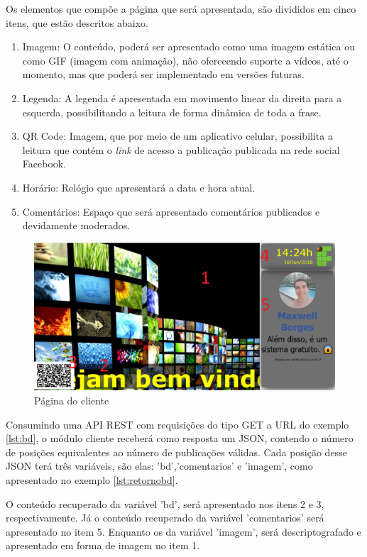 Os elementos que compõe a página que será apresentada, são divididos em cinco itens, que estão descritos abaixo.

\begin{enumerate}
   \item Imagem: O conteúdo, poderá ser apresentado como uma imagem estática ou como GIF (imagem com animação), não oferecendo suporte a vídeos, até o momento, mas que poderá ser implementado em versões futuras. 
   \item Legenda: A legenda é apresentada em movimento linear da direita para a esquerda, possibilitando a leitura de forma dinâmica de toda a frase.
   \item QR Code: Imagem, que por meio de um aplicativo celular, possibilita a leitura que contém o \textit{link} de acesso a publicação publicada na rede social Facebook.
   \item Horário: Relógio que apresentará a data e hora atual.  
   \item Comentários: Espaço que será apresentado comentários publicados e devidamente moderados.
 \end{enumerate}
  
\begin{figure}[H]
\centering
\includegraphics[scale=0.3]{figuras/cliente1}
\caption{Página do cliente}
\label{fig:cliente1}
\end{figure}

Consumindo uma API REST com requisições do tipo GET a URL do exemplo \ref{lst:bd}, o módulo cliente receberá como resposta um JSON, contendo o número de posições equivalentes ao número de publicações válidas. Cada posição desse JSON terá três variáveis, são elas: 'bd','comentarios' e 'imagem', como apresentado no exemplo \ref{lst:retornobd}. 

O conteúdo recuperado da variável 'bd', será apresentado nos itens 2 e 3, respectivamente. Já o conteúdo recuperado da variável 'comentarios' será apresentado no item 5. Enquanto os da variável 'imagem', será descriptografado e apresentado em forma de imagem no item 1.


